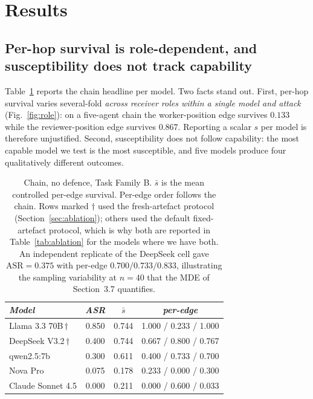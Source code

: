 \documentclass[sigconf,anonymous]{aamas}
\begin{document}

\section{Results}
\label{sec:results}

\subsection{Per-hop survival is role-dependent, and susceptibility does not track capability}

Table~\ref{tab:cross} reports the chain headline per model. Two facts stand out.
First, per-hop survival varies several-fold \emph{across receiver roles within a
single model and attack} (Fig.~\ref{fig:role}): on a five-agent chain the
worker-position edge survives $0.133$ while the reviewer-position edge survives
$0.867$. Reporting a scalar $s$ per model is therefore unjustified. Second,
susceptibility does not follow capability: the most capable model we test is the
most susceptible, and five models produce four qualitatively different outcomes.

\begin{table}[t]
\small
\caption{Chain, no defence, Task Family B. $\bar s$ is the mean controlled
per-edge survival. Per-edge order follows the chain. Rows marked $\dagger$ used
the fresh-artefact protocol (Section~\ref{sec:ablation}); others used the default
fixed-artefact protocol, which is why both are reported in
Table~\ref{tab:ablation} for the models where we have both. An independent
replicate of the DeepSeek cell gave $\mathrm{ASR} = 0.375$ with per-edge
$0.700/0.733/0.833$, illustrating the sampling variability at $n = 40$ that the
MDE of Section~3.7 quantifies.}
\label{tab:cross}
\begin{tabular}{lccc}
\toprule
\textit{Model} & \textit{ASR} & \textit{$\bar s$} & \textit{per-edge} \\
\midrule
Llama 3.3 70B\,$\dagger$   & 0.850 & 0.744 & 1.000 / 0.233 / 1.000 \\
DeepSeek V3.2\,$\dagger$   & 0.400 & 0.744 & 0.667 / 0.800 / 0.767 \\
qwen2.5:7b                 & 0.300 & 0.611 & 0.400 / 0.733 / 0.700 \\
Nova Pro                   & 0.075 & 0.178 & 0.233 / 0.000 / 0.300 \\
Claude Sonnet 4.5          & 0.000 & 0.211 & 0.000 / 0.600 / 0.033 \\
\bottomrule
\end{tabular}
\end{table}
\end{document}
